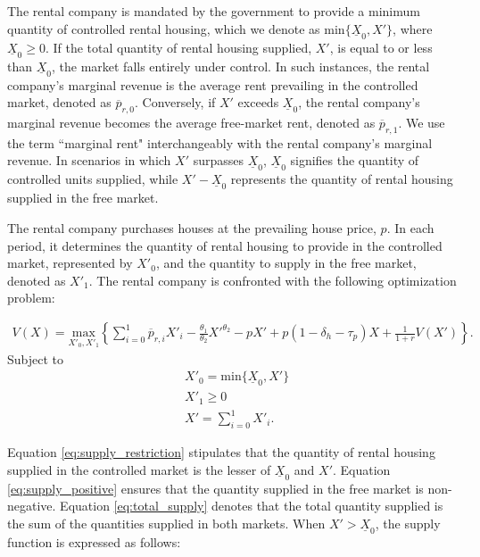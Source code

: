 \documentclass[parskip=full]{article}
\begin{document}
The rental company is mandated by the government to provide a minimum quantity of controlled rental housing, which we denote as $\mbox{min}\{\underline{X}_{0},X'\}$, where $\underline{X}_{0} \geq 0$. If the total quantity of rental housing supplied, $X'$, is equal to or less than $\underline{X}_{0}$, the market falls entirely under control. In such instances, the rental company's marginal revenue is the average rent prevailing in the controlled market, denoted as $\overline{p}_{r,0}$. Conversely, if $X'$ exceeds $\underline{X}_{0}$, the rental company's marginal revenue becomes the average free-market rent, denoted as $\overline{p}_{r,1}$. We use the term ``marginal rent" interchangeably with the rental company's marginal revenue. In scenarios in which $X'$ surpasses $\underline{X}_{0}$, $\underline{X}_{0}$ signifies the quantity of controlled units supplied, while $X' - \underline{X}_{0}$ represents the quantity of rental housing supplied in the free market.

The rental company purchases houses at the prevailing house price, $p$. In each period, it determines the quantity of rental housing to provide in the controlled market, represented by $X'_{0}$, and the quantity to supply in the free market, denoted as $X'_{1}$. The rental company is confronted with the following optimization problem:

\begin{align}\label{eq:rental_company_problem}
V(X)=\underset{X'_{0},X'_{1}} {\text{$\mbox{max} $}}\left\{\sum_{i=0}^{1} \overline{p}_{r,i}X'_{i}-\frac{\theta_{1}}{\theta_{2}}X'^{\theta_{2}}-p X'+p(1-\delta_{h}-\tau_{p})X+\frac{1}{1+r}V(X')\right\}.
\end{align}
Subject to
\begin{align}
& X'_{0}=\mbox{min}\{\underline{X}_{0},X'\} \label{eq:supply_restriction} \\
& X'_{1} \geq 0 \label{eq:supply_positive} \\
& X'=\sum^{1}_{i=0} X'_{i}. \label{eq:total_supply} 
\end{align}

\noindent Equation \eqref{eq:supply_restriction} stipulates that the quantity of rental housing supplied in the controlled market is the lesser of $\underline{X}_{0}$ and $X'$. Equation \eqref{eq:supply_positive} ensures that the quantity supplied in the free market is non-negative. Equation \eqref{eq:total_supply} denotes that the total quantity supplied is the sum of the quantities supplied in both markets. When $X'>\underline{X}_{0}$, the supply function is expressed as follows:
\end{document}
